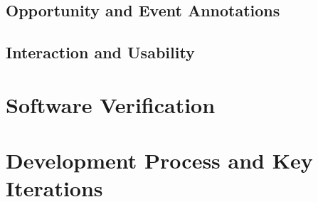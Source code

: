 \subsection{Opportunity and Event Annotations}
%

\subsection{Interaction and Usability}

\section{Software Verification}
\label{sec:software-verification}


\section{Development Process and Key Iterations}
\label{sec:development-process}


